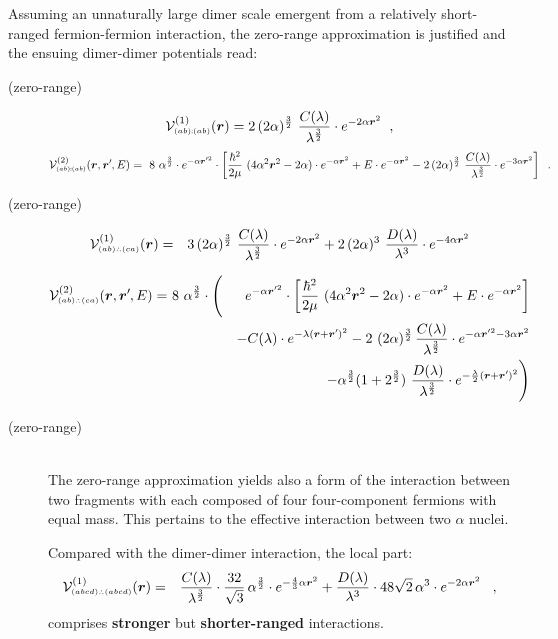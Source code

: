 \documentclass[onecolumn,preprint,superscriptaddress,nofootinbib,notitlepage,10pt,linenumbers]{revtex4-1}
\newcommand*{\mprime}{^{\prime}\mkern-1.2mu}
\newcommand{\be}{\begin{equation}}
\newcommand{\ee}{\end{equation}}
\newcommand{\ve}[1]{\ensuremath{\boldsymbol{#1}}}
\newcommand{\cc}{\ensuremath C(\lambda)}
\newcommand{\dd}{\ensuremath D(\lambda)}
\newcommand{\abab}{\ensuremath $(ab)\!\!:\!\!(ab)$}
\newcommand{\abca}{\ensuremath $(ab)\wasytherefore(ca)$}
\newcommand{\alal}{\ensuremath $(abcd)\wasytherefore(abcd)$}
\begin{document}
Assuming an unnaturally large dimer scale emergent from a relatively short-ranged fermion-fermion interaction,
the zero-range approximation is justified and the ensuing dimer-dimer potentials read:

\begin{description}
	\item[(zero-range)~\abab]
\be
\mathcal{V}^{(1)}_{\text{\tiny\abab}}(\ve{r})=
2\,(2\alpha)^{\frac{3}{2}}~\frac{\cc}{\lambda^{\frac{3}{2}}}\cdot
 e^{-2\alpha\ve{r}^2}\;\;,
\ee
\be
\mathcal{V}^{(2)}_{\text{\tiny\abab}}(\ve{r},\ve{r}\mprime,E)=
~8~\alpha^{\frac{3}{2}}\cdot e^{-\alpha\ve{r}\mprime^2}\cdot
\left[\frac{\hbar^2}{2\mu}~(4\alpha^2\ve{r}^2-2\alpha)
\cdot e^{-\alpha\ve{r}^2}+
E\cdot e^{-\alpha\ve{r}^2}
-2\,(2\alpha)^{\frac{3}{2}}~\frac{\cc}{\lambda^{\frac{3}{2}}}\cdot
 e^{-3\alpha\ve{r}^2}\right]\;\;.
\ee

\item[(zero-range)~\abca]
\begin{eqnarray}
\mathcal{V}^{(1)}_{\text{\tiny\abca}}(\ve{r})&=&
3\,(2\alpha)^{\frac{3}{2}}~\frac{\cc}{\lambda^{\frac{3}{2}}}\cdot
 e^{-2\alpha\ve{r}^2}
 +2\,(2\alpha)^{3}~\frac{\dd}{\lambda^{3}}\cdot
 e^{-4\alpha\ve{r}^2}
\end{eqnarray}


\begin{eqnarray}
\mathcal{V}^{(2)}_{\text{\tiny\abca}}(\ve{r},\ve{r}\mprime,E)=&~8~\alpha^{\frac{3}{2}}\cdot\Bigg(&e^{-\alpha\ve{r}\mprime^2}\cdot
\left[\frac{\hbar^2}{2\mu}~(4\alpha^2\ve{r}^2-2\alpha)
\cdot e^{-\alpha\ve{r}^2}+
E\cdot e^{-\alpha\ve{r}^2}\right]\\
&&-\cc\cdot
 e^{-\lambda(\ve{r}+\ve{r}\mprime)^2}
-2~(2\alpha)^{\frac{3}{2}}\,\frac{\cc}{\lambda^{\frac{3}{2}}}\cdot
 e^{-\alpha\ve{r}\mprime^2-3\alpha\ve{r}^2}\\
 &&-\alpha^{\frac{3}{2}}(1+2^{\frac{3}{2}})~\frac{\dd}{\lambda^{\frac{3}{2}}}\cdot
 e^{-\frac{\lambda}{2}(\ve{r}+\ve{r}\mprime)^2}\Bigg)
\end{eqnarray}


\item[(zero-range)~\alal]\hfil\\
The zero-range approximation yields also a form of the interaction between two fragments with each composed of
four four-component fermions with equal mass. This pertains to the effective interaction between two
$\alpha$ nuclei.

Compared with the dimer-dimer interaction, the local part:
\begin{eqnarray}
\mathcal{V}^{(1)}_{\text{\tiny\alal}}(\ve{r})&=&
\frac{\cc}{\lambda^{\frac{3}{2}}}\cdot\frac{32}{\sqrt{3}}\,\alpha^{\frac{3}{2}}\cdot
 e^{-\frac{4}{3}\alpha\ve{r}^2}
 +\frac{\dd}{\lambda^3}\cdot48\sqrt{2}\,\alpha^3\cdot
 e^{-2\alpha\ve{r}^2}\;\;\;,
\end{eqnarray}
comprises {\bf stronger} but {\bf shorter-ranged} interactions.


\end{description}
\end{document}
